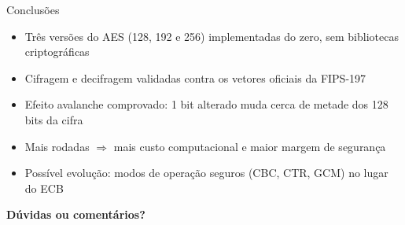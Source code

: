 \documentclass[aspectratio=169,11pt]{beamer}
\begin{document}
\begin{frame}{Conclusões}
  \begin{itemize}
    \item Três versões do AES (128, 192 e 256) implementadas do zero, sem bibliotecas criptográficas
    \item Cifragem e decifragem validadas contra os vetores oficiais da FIPS-197
    \item Efeito avalanche comprovado: 1 bit alterado muda cerca de metade dos 128 bits da cifra
    \item Mais rodadas $\Rightarrow$ mais custo computacional e maior margem de segurança
    \item Possível evolução: modos de operação seguros (CBC, CTR, GCM) no lugar do ECB
  \end{itemize}
  \vspace{1.2em}
  \begin{center}
    {\Large \textbf{Dúvidas ou comentários?}}
  \end{center}
\end{frame}
\end{document}

